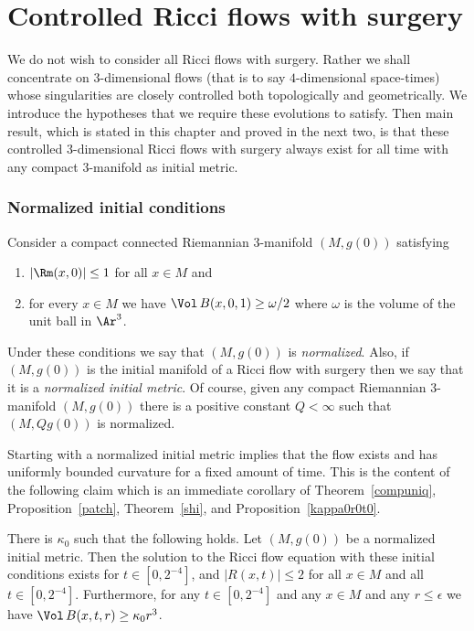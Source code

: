\chapter{Controlled Ricci flows with surgery}
\label{chap:controlled-ricci-flows}

 We do not
wish to consider all Ricci flows with surgery. Rather we shall
concentrate on $3$-dimensional flows (that is to say $4$-dimensional
space-times) whose singularities are closely controlled both
topologically and geometrically. We introduce the hypotheses that we
require these evolutions to satisfy. Then main result, which is
stated in this chapter and proved in the next two, is that these
controlled $3$-dimensional Ricci flows with surgery always exist for
all time with any compact $3$-manifold as initial metric.

\subsection{Normalized initial conditions}

Consider a compact connected Riemannian $3$-manifold $(M,g(0))$
satisfying
\begin{enumerate}
\item[(1)] $|\Rm(x,0)|\le 1$ for all $x\in M$ and
\item[(2)] for every $x\in M$ we have $\Vol\,B(x,0,1)\ge \omega/2$ where
$\omega$ is the volume of the unit ball in $\Ar^3$.
\end{enumerate}

Under these conditions we say that $(M,g(0))$ is {\em normalized}.
Also, if $(M,g(0))$ is the initial manifold of a Ricci flow with
surgery then we say that it is a {\em normalized initial metric}. Of
course, given any compact Riemannian $3$-manifold $(M,g(0))$ there
is a positive constant $Q<\infty$ such that $(M,Qg(0))$ is
normalized.




Starting with a normalized initial metric implies that the flow exists
and has uniformly bounded curvature for a fixed amount of time. This is the
content of the following claim which is an immediate corollary of
Theorem~\ref{compuniq}, Proposition~\ref{patch}, Theorem~\ref{shi},
and  Proposition~\ref{kappa0r0t0}.


\begin{claim}
\label{claim:normalized-initial-existence}\label{newkappa0r0t0}
 There is $\kappa_0$ such that the following holds. Let $(M,g(0))$ be a normalized initial
metric. Then the solution to the Ricci flow equation with these
initial conditions exists for $t\in [0,2^{-4}]$, and  $|R(x,t)|\le
2$ for all $x\in M$ and all $t\in [0,2^{-4}]$. Furthermore, for any
$t\in [0,2^{-4}]$ and any $x\in M$ and any $r\le \epsilon$ we have
$\Vol\,B(x,t,r)\ge \kappa_0r^3$.
\end{claim}



